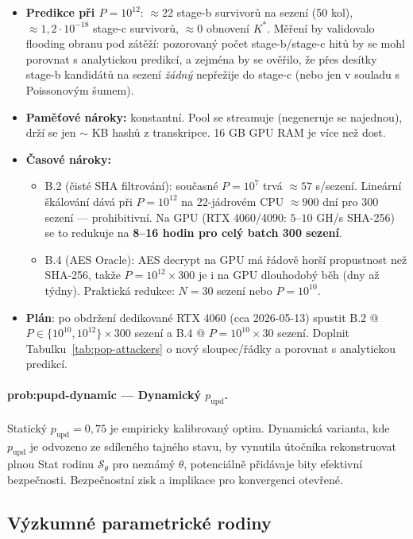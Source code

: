 \documentclass[11pt,a4paper]{article}
\begin{document}
\begin{itemize}[leftmargin=*]
\item \textbf{Predikce při $P = 10^{12}$}: $\approx 22$ stage-b survivorů na sezení (50 kol), $\approx 1{,}2 \cdot 10^{-18}$ stage-c survivorů, $\approx 0$ obnovení $K^*$. Měření by validovalo flooding obranu pod zátěží: pozorovaný počet stage-b/stage-c hitů by se mohl porovnat s analytickou predikcí, a zejména by se ověřilo, že přes desítky stage-b kandidátů na sezení \emph{žádný} nepřežije do stage-c (nebo jen v souladu s Poissonovým šumem).
\item \textbf{Paměťové nároky:} konstantní. Pool se streamuje (negeneruje se najednou), drží se jen $\sim$ KB hashů z transkripce. 16 GB GPU RAM je více než dost.
\item \textbf{Časové nároky:}
\begin{itemize}[leftmargin=*]
\item B.2 (čisté SHA filtrování): současné $P = 10^7$ trvá $\approx 57$ s/sezení. Lineární škálování dává při $P = 10^{12}$ na 22-jádrovém CPU $\approx 900$ dní pro 300 sezení --- prohibitivní. Na GPU (RTX 4060/4090: $5$--$10$ GH/s SHA-256) se to redukuje na \textbf{8--16 hodin pro celý batch 300 sezení}.
\item B.4 (AES Oracle): AES decrypt na GPU má řádově horší propustnost než SHA-256, takže $P = 10^{12} \times 300$ je i na GPU dlouhodobý běh (dny až týdny). Praktická redukce: $N = 30$ sezení nebo $P = 10^{10}$.
\end{itemize}
\item \textbf{Plán}: po obdržení dedikované RTX 4060 (cca 2026-05-13) spustit B.2 @ $P \in \{10^{10}, 10^{12}\} \times 300$ sezení a B.4 @ $P = 10^{10} \times 30$ sezení. Doplnit Tabulku~\ref{tab:pop-attackers} o nový sloupec/řádky a porovnat s analytickou predikcí.
\end{itemize}

\paragraph{prob:pupd-dynamic --- Dynamický $p_\text{upd}$.} Statický $p_\text{upd} = 0{,}75$ je empiricky kalibrovaný optim. Dynamická varianta, kde $p_\text{upd}$ je odvozeno ze sdíleného tajného stavu, by vynutila útočníka rekonstruovat plnou Stat rodinu $\mathcal{S}_\theta$ pro neznámý $\theta$, potenciálně přidávaje bity efektivní bezpečnosti. Bezpečnostní zisk a implikace pro konvergenci otevřené.

\subsection{Výzkumné parametrické rodiny}
\end{document}
